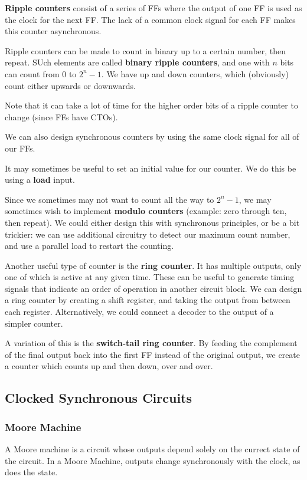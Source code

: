 \documentclass[12pt]{article}
\begin{document}
{\bf Ripple counters} consist of a series of FFs where the output of one FF is used as the clock for the next FF. The lack of a common clock signal for each FF makes this counter asynchronous.

Ripple counters can be made to count in binary up to a certain number, then repeat. SUch elements are called {\bf binary ripple counters}, and one with $n$ bits can count from 0 to $2^n - 1$. We have up and down counters, which (obviously) count either upwards or downwards.

Note that it can take a lot of time for the higher order bits of a ripple counter to change (since FFs have CTOs).

We can also design synchronous counters by using the same clock signal for all of our FFs.

It may sometimes be useful to set an initial value for our counter. We do this be using a {\bf load} input.

Since we sometimes may not want to count all the way to $2^n - 1$, we may sometimes wish to implement {\bf modulo counters} (example: zero through ten, then repeat). We could either design this with synchronous principles, or be a bit trickier: we can use additional circuitry to detect our maximum count number, and use a parallel load to restart the counting.

Another useful type of counter is the {\bf ring counter}. It has multiple outputs, only one of which is active at any given time. These can be useful to generate timing signals that indicate an order of operation in another circuit block. We can design a ring counter by creating a shift register, and taking the output from between each register. Alternatively, we could connect a decoder to the output of a simpler counter.

A variation of this is the {\bf switch-tail ring counter}. By feeding the complement of the final output back into the first FF instead of the original output, we create a counter which counts up and then down, over and over.

\subsection*{Clocked Synchronous Circuits}
\subsubsection*{Moore Machine}
A Moore machine is a circuit whose outputs depend solely on the currect state of the circuit. In a Moore Machine, outputs change synchronously with the clock, as does the state.
\end{document}

